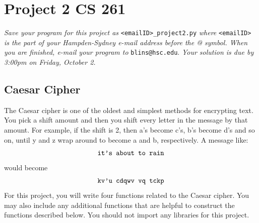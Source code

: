 \documentclass[12pt]{article}
\begin{document}
\section*{Project 2 \hfill CS 261}

\textit{Save your program for this project as} \verb|<emailID>_project2.py| \textit{where} \verb|<emailID>| \textit{is the part of your Hampden-Sydney e-mail address before the @ symbol. When you are finished, e-mail your program to} \verb|blins@hsc.edu|. \textit{Your solution is due by 3:00pm on Friday, October 2. }

\subsection*{Caesar Cipher}

The Caesar cipher is one of the oldest and simplest methods for encrypting text. You pick a shift amount and then you shift every letter in the message by that amount.  For example, if the shift is 2, then a's become c's, b's become d's and so on, until y and z wrap around to become a and b, respectively.  A message like:
$$\verb|it's about to rain|$$
would become
$$\verb|kv'u cdqwv vq tckp|$$
For this project, you will write four functions related to the Caesar cipher.  You may also include any additional functions that are helpful to construct the functions described below.  You should not import any libraries for this project. 
\end{document}
